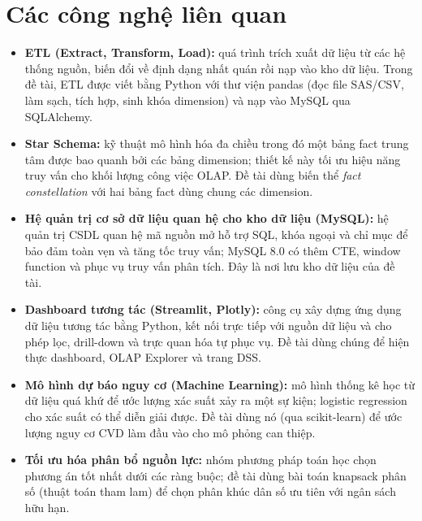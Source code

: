 \section{Các công nghệ liên quan}
\begin{itemize}
\item \textbf{ETL (Extract, Transform, Load):} quá trình trích xuất dữ liệu từ các hệ thống nguồn, biến đổi về định dạng nhất quán rồi nạp vào kho dữ liệu. Trong đề tài, ETL được viết bằng Python với thư viện pandas (đọc file SAS/CSV, làm sạch, tích hợp, sinh khóa dimension) và nạp vào MySQL qua SQLAlchemy.
\item \textbf{Star Schema:} kỹ thuật mô hình hóa đa chiều trong đó một bảng fact trung tâm được bao quanh bởi các bảng dimension; thiết kế này tối ưu hiệu năng truy vấn cho khối lượng công việc OLAP. Đề tài dùng biến thể \emph{fact constellation} với hai bảng fact dùng chung các dimension.
\item \textbf{Hệ quản trị cơ sở dữ liệu quan hệ cho kho dữ liệu (MySQL):} hệ quản trị CSDL quan hệ mã nguồn mở hỗ trợ SQL, khóa ngoại và chỉ mục để bảo đảm toàn vẹn và tăng tốc truy vấn; MySQL 8.0 có thêm CTE, window function và  phục vụ truy vấn phân tích. Đây là nơi lưu kho dữ liệu của đề tài.
\item \textbf{Dashboard tương tác (Streamlit, Plotly):} công cụ xây dựng ứng dụng dữ liệu tương tác bằng Python, kết nối trực tiếp với nguồn dữ liệu và cho phép lọc, drill-down và trực quan hóa tự phục vụ. Đề tài dùng chúng để hiện thực dashboard, OLAP Explorer và trang DSS.
\item \textbf{Mô hình dự báo nguy cơ (Machine Learning):} mô hình thống kê học từ dữ liệu quá khứ để ước lượng xác suất xảy ra một sự kiện; logistic regression cho xác suất có thể diễn giải được. Đề tài dùng nó (qua scikit-learn) để ước lượng nguy cơ CVD làm đầu vào cho mô phỏng can thiệp.
\item \textbf{Tối ưu hóa phân bổ nguồn lực:} nhóm phương pháp toán học chọn phương án tốt nhất dưới các ràng buộc; đề tài dùng bài toán knapsack phân số (thuật toán tham lam) để chọn phân khúc dân số ưu tiên với ngân sách hữu hạn.
\end{itemize}
